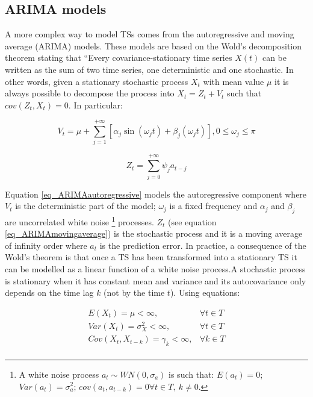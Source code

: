 \subsection{ARIMA models} \label{secARIMA}

A more complex way to model TSs comes from the autoregressive and moving average (ARIMA) models. These models are based on the Wold’s decomposition theorem stating that “Every covariance-stationary time series $X(t)$ can be written as the sum of two time series, one deterministic and one stochastic. In other words, given a stationary stochastic process $X_t$ with mean value $\mu$ it is always possible to decompose the process into $X_t=Z_t+V_t$ such that $cov\left(Z_t,X_t\right)=0$. In particular:

\begin{equation}
V_t=\mu+\sum_{j=1}^{+\infty}\left[\alpha_j\sin{\left(\omega_jt\right)}+\beta_j\left(\omega_jt\right)\right],0\le\omega_j\le\pi
\label{eq_ARIMAautoregressive}
\end{equation}

\begin{equation}
Z_t=\sum_{j=0}^{+\infty}{\psi_ja_{t-j}}
\label{eq_ARIMAmovingaverage}
\end{equation}

Equation \ref{eq_ARIMAautoregressive} models the autoregressive component where $V_t$ is the deterministic part of the model; $\omega_j$ is a fixed frequency and $\alpha_j$ and $\beta_j$ are uncorrelated white noise \footnote{A white noise process $a_t \sim WN\left(0,\sigma_a\right)$ is such that: $E\left(a_t\right)=0$; $Var\left(a_t\right)=\sigma_a^2$; $cov\left(a_t,a_{t-k}\right)=0 \forall t\in T,\ k\neq0$.} processes. $Z_t$ (see equation \ref{eq_ARIMAmovingaverage}) is the stochastic process and it is a moving average of infinity order where $a_t$ is the prediction error. In practice, a consequence of the Wold’s theorem is that once a TS has been transformed into a stationary TS it can be modelled as a linear function of a white noise process.A stochastic process is stationary when it has constant mean and variance and its autocovariance only depends on the time lag $k$ (not by the time $t$). Using equations:

\begin{equation}
\begin{split}
    E\left(X_t\right)=\mu<\infty,\ & \forall t\in T\\
    Var\left(X_t\right)=\sigma_X^2<\infty,\ & \forall t\in T\\
    Cov\left(X_t,X_{t-k}\right)=\gamma_k<\infty,& \forall k\in T\\
\end{split}
\label{eq_stationarity}
\end{equation}

